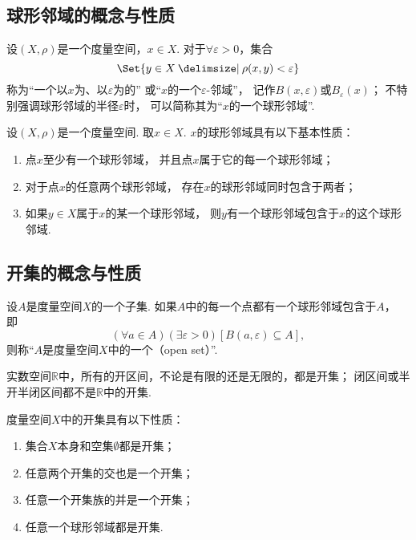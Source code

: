 \subsection{球形邻域的概念与性质}
\begin{definition}\label{definition:度量空间.球形邻域的概念}
设\((X,\rho)\)是一个度量空间，\(x \in X\).
对于\(\forall\varepsilon>0\)，集合\[
	\Set{ y \in X \given \rho(x,y) < \varepsilon }
\]
称为“一个以\(x\)为、以\(\varepsilon\)为的”
或“\(x\)的一个\(\varepsilon\)-邻域”，
记作\(B(x,\varepsilon)\)或\(B_{\varepsilon}(x)\)；
不特别强调球形邻域的半径\(\varepsilon\)时，
可以简称其为“\(x\)的一个球形邻域”.
\end{definition}

\begin{theorem}\label{theorem:度量空间.球形邻域的性质}
设\((X,\rho)\)是一个度量空间.
取\(x \in X\).
\(x\)的球形邻域具有以下基本性质：
\begin{enumerate}
	\item 点\(x\)至少有一个球形邻域，
	并且点\(x\)属于它的每一个球形邻域；
	\item 对于点\(x\)的任意两个球形邻域，
	存在\(x\)的球形邻域同时包含于两者；
	\item 如果\(y \in X\)属于\(x\)的某一个球形邻域，
	则\(y\)有一个球形邻域包含于\(x\)的这个球形邻域.
\end{enumerate}
\end{theorem}

\subsection{开集的概念与性质}
\begin{definition}\label{definition:度量空间.开集的概念}
设\(A\)是度量空间\(X\)的一个子集.
如果\(A\)中的每一个点都有一个球形邻域包含于\(A\)，
即\[
	(\forall a \in A)
	(\exists\varepsilon>0)
	[B(a,\varepsilon) \subseteq A],
\]
则称“\(A\)是度量空间\(X\)中的一个（open set）”.
\end{definition}

\begin{example}
实数空间\(\mathbb{R}\)中，所有的开区间，不论是有限的还是无限的，都是开集；
闭区间或半开半闭区间都不是\(\mathbb{R}\)中的开集.
\end{example}

\begin{theorem}\label{theorem:度量空间.开集的性质}
度量空间\(X\)中的开集具有以下性质：
\begin{enumerate}
\item 集合\(X\)本身和空集\(\emptyset\)都是开集；
\item 任意两个开集的交也是一个开集；
\item 任意一个开集族的并是一个开集；
\item 任意一个球形邻域都是开集.
\end{enumerate}
\end{theorem}

